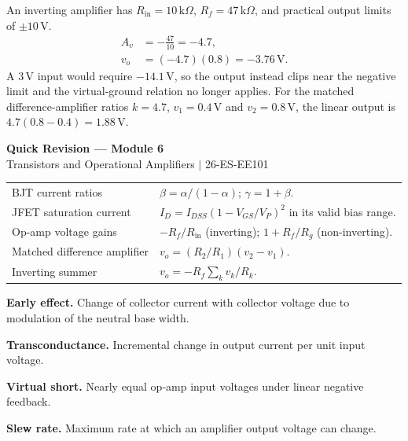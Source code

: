 \documentclass[12pt,a4paper]{article}
\renewcommand{\arraystretch}{1.45}
\begin{document}
\begin{tcolorbox}[examplebox,title={Closed-loop gain and output swing}]
An inverting amplifier has \(R_{\mathrm{in}}=10\,\mathrm{k}\Omega\), \(R_f=47\,\mathrm{k}\Omega\), and practical output limits of \(\pm 10\,\mathrm V\).
\[
\begin{aligned}
A_v&=-\frac{47}{10}=-4.7,\\
v_o&=(-4.7)(0.8)=-3.76\,\mathrm V .
\end{aligned}
\]
A \(3\,\mathrm V\) input would require \(-14.1\,\mathrm V\), so the output instead clips near the negative limit and the virtual-ground relation no longer applies. For the matched difference-amplifier ratios \(k=4.7\), \(v_1=0.4\,\mathrm V\) and \(v_2=0.8\,\mathrm V\), the linear output is \(4.7(0.8-0.4)=1.88\,\mathrm V\).
\end{tcolorbox}

\newpage
\begin{center}
  {\large\bfseries\color{myred} Quick Revision --- Module 6}\\[3pt]
  {\small\color{mydark} Transistors and Operational Amplifiers $|$ 26-ES-EE101}
\end{center}
\noindent{\color{myred}\rule{\linewidth}{1.2pt}}
\vspace{4pt}

\begin{tcolorbox}[formulabox, title={Key Formulas and Concepts at a Glance}]
\renewcommand{\arraystretch}{1.35}
\begin{tabularx}{\linewidth}{B{4.4cm}Y}
BJT current ratios & $\beta=\alpha/(1-\alpha)$; $\gamma=1+\beta$. \\[3pt]
JFET saturation current & $I_D=I_{DSS}(1-V_{GS}/V_P)^2$ in its valid bias range. \\[3pt]
Op-amp voltage gains & $-R_f/R_{\mathrm{in}}$ (inverting); $1+R_f/R_g$ (non-inverting). \\[3pt]
Matched difference amplifier & $v_o=(R_2/R_1)(v_2-v_1)$. \\[3pt]
Inverting summer & $v_o=-R_f\sum_k v_k/R_k$. \\[3pt]
\end{tabularx}
\end{tcolorbox}

\begin{tcolorbox}[defbox, title={One-Line Definitions}]
\textbf{Early effect.} Change of collector current with collector voltage due to modulation of the neutral base width.

\textbf{Transconductance.} Incremental change in output current per unit input voltage.

\textbf{Virtual short.} Nearly equal op-amp input voltages under linear negative feedback.

\textbf{Slew rate.} Maximum rate at which an amplifier output voltage can change.
\end{tcolorbox}
\end{document}
